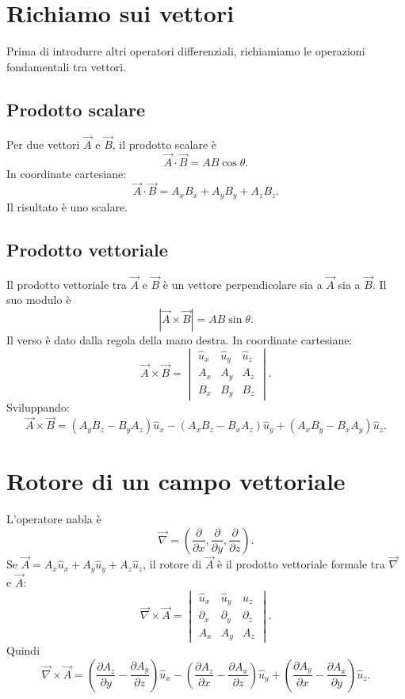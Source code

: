 \documentclass[a4paper]{article}
\begin{document}
\section{Richiamo sui vettori}

Prima di introdurre altri operatori differenziali, richiamiamo le operazioni fondamentali tra vettori.

\subsection{Prodotto scalare}

Per due vettori \(
\vec{A}\) e \(\vec{B}\), il prodotto scalare è
\[
    \vec{A}\cdot\vec{B}=AB\cos\theta.
\]
In coordinate cartesiane:
\[
    \vec{A}\cdot\vec{B}=A_xB_x+A_yB_y+A_zB_z.
\]
Il risultato è uno scalare.

\subsection{Prodotto vettoriale}

Il prodotto vettoriale tra \(\vec{A}\) e \(\vec{B}\) è un vettore perpendicolare sia a \(\vec{A}\) sia a \(\vec{B}\). Il suo modulo è
\[
    |\vec{A}\times\vec{B}|=AB\sin\theta.
\]
Il verso è dato dalla regola della mano destra. In coordinate cartesiane:
\[
    \vec{A}\times\vec{B}
    =
    \begin{vmatrix}
        \hat{u}_x & \hat{u}_y & \hat{u}_z \\
        A_x & A_y & A_z \\
        B_x & B_y & B_z
    \end{vmatrix}.
\]
Sviluppando:
\[
    \vec{A}\times\vec{B}
    =(A_yB_z-B_yA_z)\hat{u}_x
    -(A_xB_z-B_xA_z)\hat{u}_y
    +(A_xB_y-B_xA_y)\hat{u}_z.
\]

\section{Rotore di un campo vettoriale}

L'operatore nabla è
\[
    \vec{\nabla}=\left(\frac{\partial}{\partial x},\frac{\partial}{\partial y},\frac{\partial}{\partial z}\right).
\]
Se \(\vec{A}=A_x\hat{u}_x+A_y\hat{u}_y+A_z\hat{u}_z\), il rotore di \(\vec{A}\) è il prodotto vettoriale formale tra \(\vec{\nabla}\) e \(\vec{A}\):
\[
    \vec{\nabla}\times\vec{A}
    =
    \begin{vmatrix}
        \hat{u}_x & \hat{u}_y & \hat{u}_z \\
        \partial_x & \partial_y & \partial_z \\
        A_x & A_y & A_z
    \end{vmatrix}.
\]
Quindi
\[
    \vec{\nabla}\times\vec{A}
    =\left(\frac{\partial A_z}{\partial y}-\frac{\partial A_y}{\partial z}\right)\hat{u}_x
    -\left(\frac{\partial A_z}{\partial x}-\frac{\partial A_x}{\partial z}\right)\hat{u}_y
    +\left(\frac{\partial A_y}{\partial x}-\frac{\partial A_x}{\partial y}\right)\hat{u}_z.
\]
\end{document}
